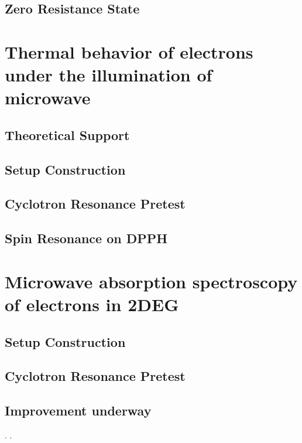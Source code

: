 \documentclass[12pt]{ruthesis}
\begin{document}
\section{Zero Resistance State}\label{ZRS}

\chapter{Thermal behavior of electrons under the illumination of microwave}\label{Thermal}

\section{Theoretical Support}\label{Theoretical}

\section{Setup Construction}\label{Construction}

\section{Cyclotron Resonance Pretest}\label{Cyclotron}

\section{Spin Resonance on DPPH}\label{DPPH}

\chapter{Microwave absorption spectroscopy of electrons in 2DEG}\label{Absorption}

\section{Setup Construction}\label{Construction}

\section{Cyclotron Resonance Pretest}\label{Cyclotron}

\section{Improvement underway}\label{Improvement}

\cite{Chen01APL}.
.
\end{document}
